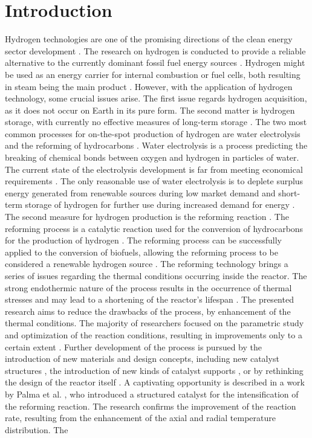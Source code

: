 \documentclass[preprint,12pt]{elsarticle}
\begin{document}

\section{Introduction}

Hydrogen technologies are one of the promising directions of the clean energy sector development \cite{Qazi2022}. The research on hydrogen is conducted to provide a reliable alternative to the currently dominant fossil fuel energy sources \cite{Zou2016, Liobikiene2021}. Hydrogen might be used as an energy carrier for internal combustion or fuel cells, both resulting in steam being the main product \cite{Xu2020, Shadidi2021}.
 However, with the application of hydrogen technology, some crucial issues arise. The first issue regards hydrogen acquisition, as it does not occur on Earth in its pure form. The second matter is hydrogen storage, with currently no effective measures of long-term storage \cite{Hassan2021, Tarhan2022}.  The two most common processes for on-the-spot production of hydrogen are water electrolysis and the reforming of hydrocarbons  \cite{Hassan2021RSER, Azizan2020}. Water electrolysis is a process predicting the breaking of chemical bonds between oxygen and hydrogen in particles of water. The current state of the electrolysis development is far from meeting economical requirements \cite{Yukesh2021}. The only reasonable use of water electrolysis is to deplete surplus energy generated from renewable sources during low market demand and short-term storage of hydrogen for further use during increased demand for energy \cite{Chi2018}. The second measure for hydrogen production is the reforming reaction \cite{Zhang2021, Nkulikiyinka2020}. The reforming process is a catalytic reaction used for the conversion of hydrocarbons for the production of hydrogen \cite{Taherian2022, Faheem2022}. The reforming process can be successfully applied to the conversion of biofuels, allowing the reforming process to be considered a renewable hydrogen source \cite{Zhao2020, Gao2022}. The reforming technology brings a series of issues regarding the thermal conditions occurring inside the reactor. The strong endothermic nature of the process results in the occurrence of thermal stresses and may lead to a shortening of the reactor's lifespan \cite{Mozdzierz2014}. The presented research aims to reduce the drawbacks of the process, by enhancement of the thermal conditions. The majority of researchers focused on the parametric study and optimization of the reaction conditions, resulting in improvements only to a certain extent \cite{Simpson2007, Naseri2015}. Further development of the process is pursued by the introduction of new materials and design concepts, including new catalyst structures \cite{Ali2016, Kolaczkowski2016}, the introduction of new kinds of catalyst supports \cite{Yadav2019}, or by rethinking the design of the reactor itself \cite{Butcher2014, Meloni2020, Cherif2022}.  A captivating opportunity is described in a work by Palma et al. \cite{Palma2017}, who introduced a structured catalyst for the intensification of the reforming reaction. The research confirms the improvement of the reaction rate, resulting from the enhancement of the axial and radial temperature distribution. The 
\end{document}
